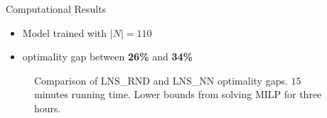 \documentclass[aspectratio=1610]{beamer}
\begin{document}
\begin{frame}{Computational Results}
	\begin{itemize}
		\item Model trained with $|N| = 110$
		\item {} optimality gap between \textbf{26\%} and \textbf{34\%}
	\end{itemize}
	\begin{figure}
		\caption{Comparison of LNS\_RND and LNS\_NN optimality gaps. $15$ minutes running time. Lower bounds from solving MILP for three hours.}
	\end{figure}
\end{frame}
\end{document}
